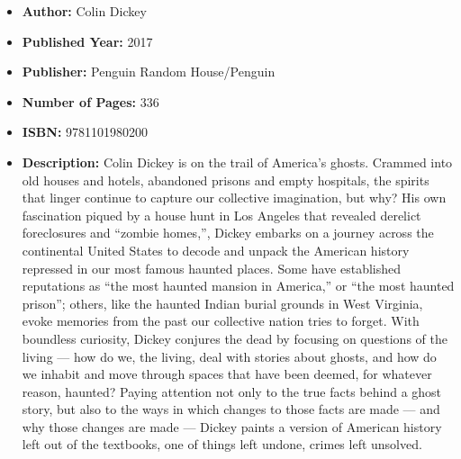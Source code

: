 \documentclass{tufte-handout}
\begin{document}
\begin{itemize}
    \item[] \textbf{Author:} Colin Dickey
    \item[] \textbf{Published Year:} 2017
    \item[] \textbf{Publisher:} Penguin Random House/Penguin
    \item[] \textbf{Number of Pages:} 336   
    \item[] \textbf{ISBN:} 9781101980200
    \item[] \textbf{Description:} Colin Dickey is on the trail of America’s ghosts. Crammed into old houses and hotels, abandoned prisons and empty hospitals, the spirits that linger continue to capture our collective imagination, but why? His own fascination piqued by a house hunt in Los Angeles that revealed derelict foreclosures and ``zombie homes,'', Dickey embarks on a journey across the continental United States to decode and unpack the American history repressed in our most famous haunted places. Some have established reputations as ``the most haunted mansion in America,'' or ``the most haunted prison''; others, like the haunted Indian burial grounds in West Virginia, evoke memories from the past our collective nation tries to forget. With boundless curiosity, Dickey conjures the dead by focusing on questions of the living --- how do we, the living, deal with stories about ghosts, and how do we inhabit and move through spaces that have been deemed, for whatever reason, haunted? Paying attention not only to the true facts behind a ghost story, but also to the ways in which changes to those facts are made --- and why those changes are made --- Dickey paints a version of American history left out of the textbooks, one of things left undone, crimes left unsolved.
\end{itemize}
\end{document}
